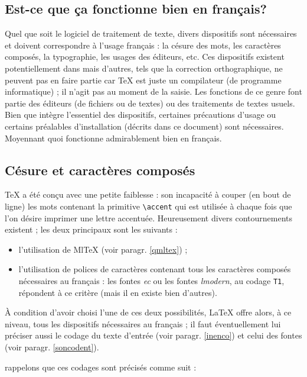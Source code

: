 \documentclass[a4paper,12pt,openright]{article}
\begin{document}
\subsection{Est-ce que ça fonctionne bien en français?}
 Quel que soit le logiciel de traitement de texte, divers dispositifs sont
nécessaires et doivent correspondre à l'usage français : la césure des mots, les
caractères composés, la typographie, les usages des éditeurs, etc. Ces dispositifs
existent potentiellement dans \hbox{\pgLapdTeX} mais d'autres, tels que la correction
orthographique, ne peuvent pas en faire partie car \TeX{} est juste un compilateur
(de programme informatique) ; il n'agit pas au moment de la saisie.
Les fonctions de ce genre font partie des éditeurs (de fichiers ou de textes)
ou des traitements de textes usuels. Bien que {\pgLapdTeX} intègre l'essentiel des
dispositifs, certaines précautions d'usage ou certains préalables d'installation
(décrits dans ce document) sont nécessaires. Moyennant quoi {\pgLapdTeX} fonctionne
admirablement bien en français.
\subsection{ Césure et caractères composés}
 {\TeX} a été conçu avec une petite faiblesse : son incapacité à couper
(en bout de ligne) les mots contenant la primitive 
\verb!\accent! 
qui est utilisée
à chaque fois que l'on désire imprimer une lettre accentuée. Heureusement
divers contournements existent ; les deux principaux sont les suivants :

\begin{itemize}
\item l'utilisation de {Ml\TeX} (voir paragr. \ref{qmltex}) ;
\item l'utilisation de polices de caractères contenant tous les caractères composés 
nécessaires au français : les fontes \textit{ec} ou les fontes \textit{lmodern}, au
codage \texttt{T1}, répondent à ce critère (mais il en existe bien d'autres).
\end{itemize}\indpos

À condition d'avoir choisi l'une de ces deux possibilités, \LaTeX{} offre alors,
à ce niveau, tous les dispositifs nécessaires au français ; il faut éventuellement
lui préciser aussi le codage du texte d'entrée (voir paragr. \ref{inenco}) et celui des
fontes (voir paragr. \ref{soncodent}).

 rappelons que ces codages sont précisés comme suit :
\begin{center}
\end{center}
\end{document}

